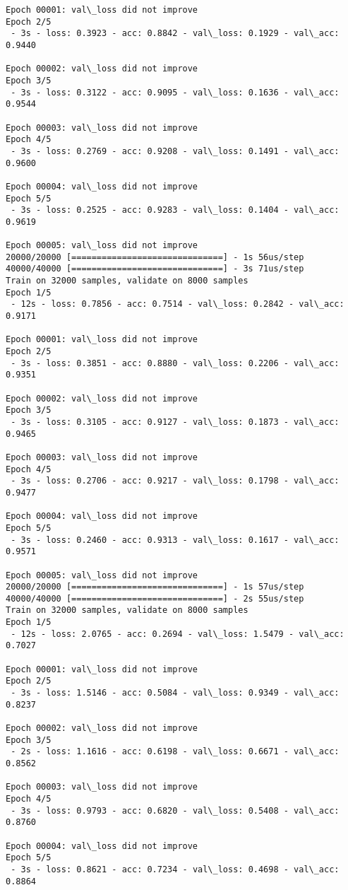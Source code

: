 \documentclass[11pt]{article}
\begin{document}
\begin{Verbatim}[commandchars=\\\{\}]
Epoch 00001: val\_loss did not improve
Epoch 2/5
 - 3s - loss: 0.3923 - acc: 0.8842 - val\_loss: 0.1929 - val\_acc: 0.9440

Epoch 00002: val\_loss did not improve
Epoch 3/5
 - 3s - loss: 0.3122 - acc: 0.9095 - val\_loss: 0.1636 - val\_acc: 0.9544

Epoch 00003: val\_loss did not improve
Epoch 4/5
 - 3s - loss: 0.2769 - acc: 0.9208 - val\_loss: 0.1491 - val\_acc: 0.9600

Epoch 00004: val\_loss did not improve
Epoch 5/5
 - 3s - loss: 0.2525 - acc: 0.9283 - val\_loss: 0.1404 - val\_acc: 0.9619

Epoch 00005: val\_loss did not improve
20000/20000 [==============================] - 1s 56us/step
40000/40000 [==============================] - 3s 71us/step
Train on 32000 samples, validate on 8000 samples
Epoch 1/5
 - 12s - loss: 0.7856 - acc: 0.7514 - val\_loss: 0.2842 - val\_acc: 0.9171

Epoch 00001: val\_loss did not improve
Epoch 2/5
 - 3s - loss: 0.3851 - acc: 0.8880 - val\_loss: 0.2206 - val\_acc: 0.9351

Epoch 00002: val\_loss did not improve
Epoch 3/5
 - 3s - loss: 0.3105 - acc: 0.9127 - val\_loss: 0.1873 - val\_acc: 0.9465

Epoch 00003: val\_loss did not improve
Epoch 4/5
 - 3s - loss: 0.2706 - acc: 0.9217 - val\_loss: 0.1798 - val\_acc: 0.9477

Epoch 00004: val\_loss did not improve
Epoch 5/5
 - 3s - loss: 0.2460 - acc: 0.9313 - val\_loss: 0.1617 - val\_acc: 0.9571

Epoch 00005: val\_loss did not improve
20000/20000 [==============================] - 1s 57us/step
40000/40000 [==============================] - 2s 55us/step
Train on 32000 samples, validate on 8000 samples
Epoch 1/5
 - 12s - loss: 2.0765 - acc: 0.2694 - val\_loss: 1.5479 - val\_acc: 0.7027

Epoch 00001: val\_loss did not improve
Epoch 2/5
 - 3s - loss: 1.5146 - acc: 0.5084 - val\_loss: 0.9349 - val\_acc: 0.8237

Epoch 00002: val\_loss did not improve
Epoch 3/5
 - 2s - loss: 1.1616 - acc: 0.6198 - val\_loss: 0.6671 - val\_acc: 0.8562

Epoch 00003: val\_loss did not improve
Epoch 4/5
 - 3s - loss: 0.9793 - acc: 0.6820 - val\_loss: 0.5408 - val\_acc: 0.8760

Epoch 00004: val\_loss did not improve
Epoch 5/5
 - 3s - loss: 0.8621 - acc: 0.7234 - val\_loss: 0.4698 - val\_acc: 0.8864


\end{Verbatim}
\end{document}
